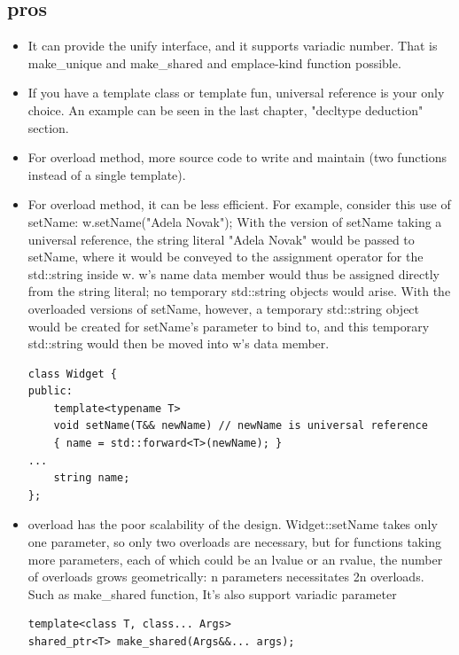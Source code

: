 \documentclass[a4paper,11pt,twoside]{book}
\begin{document}
\subsection{pros}
\begin{itemize}
\item It can provide the unify interface, and it supports variadic number. That is make\_unique and make\_shared and emplace-kind function possible.

\item If you have a template class or template fun, universal reference is your only choice. An example can be seen in the last chapter, "decltype deduction" section.

\item For overload method, more source code to write and maintain (two functions instead of a single template). 

\item For overload method, it can be less efficient. For example, consider this use of setName: w.setName("Adela Novak"); With the version of setName taking a universal reference, the string literal "Adela Novak" would be passed to setName, where it would be conveyed to the assignment operator for the std::string inside w. w's name data member would thus be assigned directly from the string literal; no temporary std::string objects would arise. With the overloaded versions of setName, however, a temporary std::string object
would be created for setName's parameter to bind to, and this temporary std::string would then be moved into w's data member.

\begin{lstlisting}[numbers=none]
class Widget {
public:
	template<typename T>
	void setName(T&& newName) // newName is universal reference
	{ name = std::forward<T>(newName); }
...
	string name;    
};
\end{lstlisting}


\item overload has the poor scalability of the design. Widget::setName takes only one parameter, so only two overloads are necessary, but for functions taking more parameters, each of which could be an lvalue or an rvalue, the number of overloads grows geometrically: n parameters necessitates 2n overloads. Such as make\_shared function, It's also support variadic parameter

\begin{lstlisting}[numbers=none]
template<class T, class... Args> 
shared_ptr<T> make_shared(Args&&... args); 


\end{lstlisting}
\end{itemize}
\end{document}
